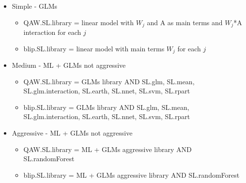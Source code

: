 \documentclass[11pt]{article}
\begin{document}
\begin{itemize}
\item Simple - GLMs
\begin{itemize}
\item QAW.SL.library = linear model with $W_j$ and A as main terms and $W_j$*A interaction for each $j$
\item blip.SL.library = linear model with main terms $W_j$ for each $j$
\end{itemize}
\item Medium - ML + GLMs not aggressive
\begin{itemize}
\item QAW.SL.library = GLMs library AND SL.glm, SL.mean, SL.glm.interaction, SL.earth, SL.nnet, SL.svm, SL.rpart
\item blip.SL.library = GLMs library AND SL.glm, SL.mean, SL.glm.interaction, SL.earth, SL.nnet, SL.svm, SL.rpart
\end{itemize}
\item Aggressive - ML + GLMs not aggressive
\begin{itemize}
\item QAW.SL.library = ML + GLMs aggressive library AND SL.randomForest
\item blip.SL.library = ML + GLMs aggressive library AND SL.randomForest
\end{itemize}
\end{itemize}
\end{document}
